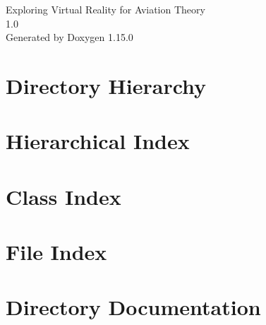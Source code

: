 \documentclass[twoside]{book}
\newcommand{\+}{\discretionary{\mbox{\scriptsize$\hookleftarrow$}}{}{}}
\newcommand{\clearemptydoublepage}{%
    \newpage{\pagestyle{empty}\cleardoublepage}%
  }
\begin{document}
  \raggedbottom
    \hypersetup{pageanchor=false,
                bookmarksnumbered=true,
                pdfencoding=unicode
               }
  \begin{titlepage}
  \vspace*{7cm}
  \begin{center}%
  {\Large Exploring Virtual Reality for Aviation Theory}\\
  [1ex]\large 1.\+0 \\
  \vspace*{1cm}
  {\large Generated by Doxygen 1.15.0}\\
  \end{center}
  \end{titlepage}
  \clearemptydoublepage
  \tableofcontents
  \clearemptydoublepage
  \hypersetup{pageanchor=true}

\chapter{Directory Hierarchy}

\chapter{Hierarchical Index}

\chapter{Class Index}

\chapter{File Index}

\chapter{Directory Documentation}





















\end{document}
